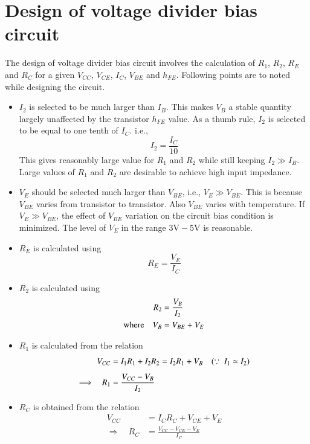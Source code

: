 \section{Design of voltage divider bias circuit}\label{sec4.9}

The design of voltage divider bias circuit involves the calculation of $R_{1}$, $R_{2}$, $R_{E}$ and $R_{C}$ for a given $V_{CC}$, $V_{CE}$, $I_{C}$, $V_{BE}$ and $h_{FE}$. Following points are to noted while designing the circuit.
\begin{itemize}
\item $I_{2}$ is selected to be much larger than $I_{B}$. This makes $V_{B}$ a stable quantity largely unaffected by the transistor $h_{FE}$ value. As a thumb rule, $I_{2}$ is selected to be equal to one tenth of $I_{C}$. i.e.,
\begin{equation}
I_{2}=\frac{I_{C}}{10}\label{eq4.32}
\end{equation}
This gives reasonably large value for $R_{1}$ and $R_{2}$ while still keeping $I_{2}\gg I_{B}$. Large values of $R_{1}$ and $R_{2}$ are desirable to achieve high input impedance.

\item $V_{E}$ should be selected much larger than $V_{BE}$, i.e., $V_{E}\gg V_{BE}$. This is because $V_{BE}$ varies from transistor to transistor. Also $V_{BE}$ varies with temperature. If $V_{E}\gg V_{BE}$, the effect of $V_{BE}$ variation on the circuit bias condition is minimized. The level of $V_{E}$ in the range $3\text{V}-5\text{V}$ is reasonable.

\item $R_{E}$ is calculated using
\begin{equation}
R_{E}=\frac{V_{E}}{I_{C}}\label{eq4.33}
\end{equation}

\item $R_{2}$ is calculated using
\begin{align}
R_{2} &= \frac{V_{B}}{I_{2}}\label{eq4.34}\\
\text{where}\quad V_{B} &= V_{BE}+V_{E}\notag
\end{align}

\item $R_{1}$ is calculated from the relation
\begin{align}
V_{CC} &= I_{1}R_{1}+I_{2}R_{2}=I_{2}R_{1}+V_{B}\quad (\because \ I_{1}\simeq I_{2})\notag\\[4pt]
\Longrightarrow\quad R_{1} &= \frac{V_{CC}-V_{B}}{I_{2}}\label{eq4.35}
\end{align}

\item $R_{C}$ is obtained from the relation
\begin{align}
V_{CC} &= I_{C}R_{C}+V_{CE}+V_{E}\\[4pt]
\Longrightarrow\quad R_{C} &= \frac{V_{CC}-V_{CE}-V_{E}}{I_{C}}\label{eq4.36}
\end{align}
\end{itemize}

